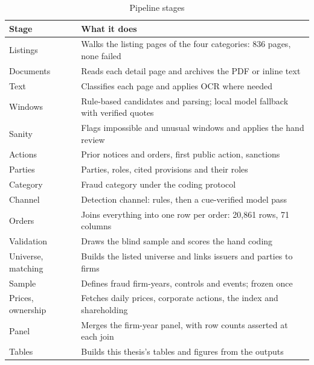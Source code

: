 \documentclass[letterpaper,11pt,leqno]{article}
\begin{document}
\begin{table}[h!]
\caption{Pipeline stages}
\begin{tabular*}{\textwidth}[]{l@{\extracolsep\fill}L{11.3cm}}
\toprule
Stage & What it does \\
\midrule
Listings & Walks the listing pages of the four categories: 836 pages, none failed \\
Documents & Reads each detail page and archives the PDF or inline text \\
Text & Classifies each page and applies OCR where needed \\
Windows & Rule-based candidates and parsing; local model fallback with verified quotes \\
Sanity & Flags impossible and unusual windows and applies the hand review \\
Actions & Prior notices and orders, first public action, sanctions \\
Parties & Parties, roles, cited provisions and their roles \\
Category & Fraud category under the coding protocol \\
Channel & Detection channel: rules, then a cue-verified model pass \\
Orders & Joins everything into one row per order: 20,861 rows, 71 columns \\
Validation & Draws the blind sample and scores the hand coding \\
Universe, matching & Builds the listed universe and links issuers and parties to firms \\
Sample & Defines fraud firm-years, controls and events; frozen once \\
Prices, ownership & Fetches daily prices, corporate actions, the index and shareholding \\
Panel & Merges the firm-year panel, with row counts asserted at each join \\
Tables & Builds this thesis's tables and figures from the outputs \\
\bottomrule
\end{tabular*}
\label{t:apppipeline}\end{table}
\end{document}
